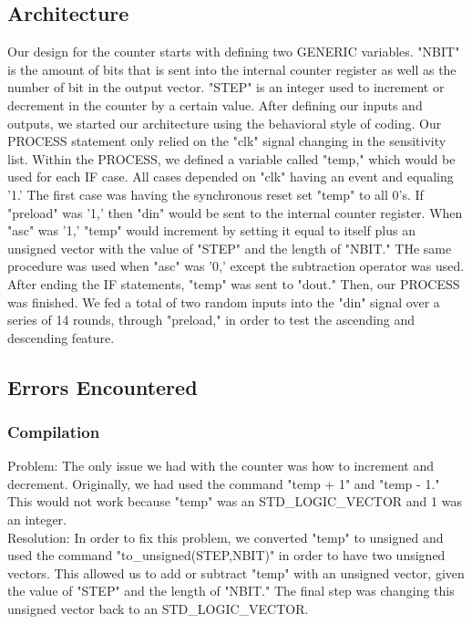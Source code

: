 \documentclass[paper=letter, fontsize=11pt]{scrartcl}
\numberwithin{equation}{section} %
\numberwithin{figure}{section} %
\numberwithin{table}{section} %
\begin{document}
\subsection{Architecture}
\begin{flushleft}
	Our design for the counter starts with defining two GENERIC variables. "NBIT" is the amount of bits that is sent into the internal counter register as well as the number of bit in the output vector. "STEP" is an integer used to increment or decrement in the counter by a certain value. After defining our inputs and outputs, we started our architecture using the behavioral style of coding. Our PROCESS statement only relied on the "clk" signal changing in the sensitivity list. Within the PROCESS, we defined a variable called "temp," which would be used for each IF case. All cases depended on "clk" having an event and equaling '1.' The first case was having the synchronous reset set "temp" to all 0's. If "preload" was '1,' then "din" would be sent to the internal counter register. When "asc" was '1,' "temp" would increment by setting it equal to itself plus an unsigned vector with the value of "STEP" and the length of "NBIT." THe same procedure was used when "asc" was '0,' except the subtraction operator was used. After ending the IF statements, "temp" was sent to "dout." Then, our PROCESS was finished. We fed a total of two random inputs into the "din" signal over a series of 14 rounds, through "preload," in order to test the ascending and descending feature.  \\[20pt]      
\end{flushleft}

\subsection{Errors Encountered}

\subsubsection{Compilation} 
\begin{flushleft}
Problem: The only issue we had with the counter was how to increment and decrement. Originally, we had used the command "temp + 1" and "temp - 1." This would not work because "temp" was an STD\_LOGIC\_VECTOR and 1 was an integer. \\[10pt] 

Resolution: In order to fix this problem, we converted "temp" to unsigned and used the command "to\_unsigned(STEP,NBIT)" in order to have two unsigned vectors. This allowed us to add or subtract "temp" with an unsigned vector, given the value of "STEP" and the length of "NBIT." The final step was changing this unsigned vector back to an STD\_LOGIC\_VECTOR.  \\[20pt] 
\end{flushleft}
\end{document}

